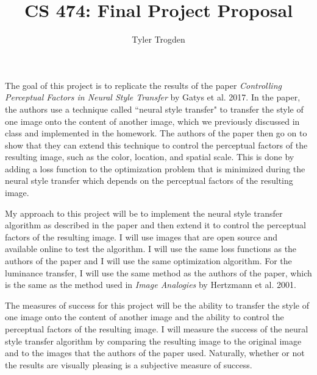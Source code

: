 \documentclass[12pt]{article}
\title{CS 474: Final Project Proposal}
\author{Tyler Trogden}
\begin{document}
\maketitle

    The goal of this project is to replicate the results of the paper \textit{Controlling Perceptual Factors
    in Neural Style Transfer} by Gatys et al. 2017. In the paper, the authors use a technique called ``neural style
    transfer" to transfer the style of one image onto the content of another image, which we previously discussed in 
    class and implemented in the homework. The authors of the paper then go on to show that they can extend this    
    technique to control the perceptual factors of the resulting image, such as the color, location, and spatial scale. 
    This is done by adding a loss function to the optimization problem that is minimized during the neural style 
    transfer which depends on the perceptual factors of the resulting image.

    My approach to this project will be to implement the neural style transfer algorithm as described in the paper
    and then extend it to control the perceptual factors of the resulting image. I will use images that are open 
    source and available online to test the algorithm. I will use the same loss functions as the authors of the paper
    and I will use the same optimization algorithm. For the luminance transfer, I will use the same method as the
    authors of the paper, which is the same as the method used in \textit{Image Analogies} by Hertzmann et al. 2001.

    The measures of success for this project will be the ability to transfer the style of one image onto the content
    of another image and the ability to control the perceptual factors of the resulting image. I will measure the 
    success of the neural style transfer algorithm by comparing the resulting image to the original image and
    to the images that the authors of the paper used. Naturally, whether or not the results are visually pleasing
    is a subjective measure of success.
\end{document}
